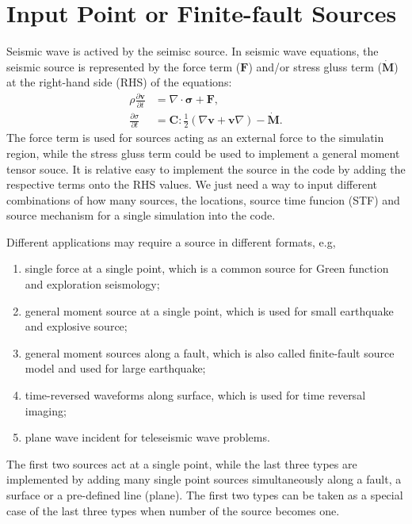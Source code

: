 \chapter{Input Point or Finite-fault Sources}\label{chapter-source}

Seismic wave is actived by the seimisc source.
In seismic wave equations, the seismic source is represented by the force term ($\mathbf{F}$)
 and/or stress gluss term ($\mathbf{\dot{\mathbf{M}}}$) at the right-hand side (RHS) of the equations:
\begin{align}
   \rho \frac{\partial \mathbf{v}}{\partial t} &= \nabla \cdot \mathbf{\sigma} + \mathbf{F}, \\
   \frac{\partial \sigma}{\partial t} &= \mathbf{C} : \frac{1}{2} \left( \nabla \mathbf{v} + \mathbf{v} \nabla \right) - \dot{\mathbf{M}}.
\end{align}
The force term is used for sources acting as an external force to the simulatin region,
while the stress gluss term could be used to implement a general moment tensor souce.
It is relative easy to implement the source in the code by adding the respective terms onto the RHS values.
We just need a way to input different combinations of how many sources, the locations, source time funcion (STF) and source mechanism
for a single simulation into the code.


Different applications may require a source in different formats, e.g,
\begin{enumerate}
    \item single force at a single point, which is a common source for Green function and exploration seismology;
    \item general moment source at a single point, which is used for small earthquake and explosive source;
    \item general moment sources along a fault, which is also called finite-fault source model and used for large earthquake;
    \item time-reversed waveforms along surface, which is used for time reversal imaging;
    \item plane wave incident for teleseismic wave problems.
\end{enumerate}
The first two sources act at a single point, while the last three types are implemented by adding many single point sources simultaneously 
along a fault, a surface or a pre-defined line (plane). The first two types can be taken as a special case of the last three types
when number of the source becomes one.


